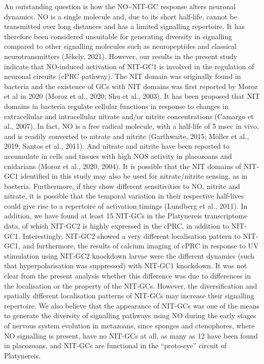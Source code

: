\documentclass[
  10pt,
  onecolumn]{article}
\begin{document}
An outstanding question is how the NO\textasciitilde NIT-GC response
alters neuronal dynamics. NO is a single molecule and, due to its short
half-life, cannot be transmitted over long distances and has a limited
signalling repertoire. It has therefore been considered unsuitable for
generating diversity in signalling compared to other signalling
molecules such as neuropeptides and classical neurotransmitters (Jékely,
2021). However, our results in the present study indicate that
NO-induced activation of NIT-GC1 is involved in the regulation of
neuronal circuits (cPRC pathway). The NIT domain was originally found in
bacteria and the existence of GCs with NIT domains was first reported by
Moroz et al in 2020 (Moroz et al., 2020; Shu et al., 2003). It has been
proposed that NIT domains in bacteria regulate cellular functions in
response to changes in extracellular and intracellular nitrate and/or
nitrite concentrations (Camargo et al., 2007). In fact, NO is a free
radical molecule, with a half-life of 5 msec in vivo, and is readily
converted to nitrate and nitrite (Garthwaite, 2015; Möller et al., 2019;
Santos et al., 2011). And nitrate and nitrite have been reported to
accumulate in cells and tissues with high NOS activity in placozoans and
cnidarians (Moroz et al., 2020, 2004). It is possible that the NIT
domains of NIT-GC1 identified in this study may also be used for
nitrate/nitrite sensing, as in bacteria. Furthermore, if they show
different sensitivities to NO, nitrite and nitrate, it is possible that
the temporal variation in their respective half-lives could give rise to
a repertoire of activation timings (Lundberg et al., 2011). In addition,
we have found at least 15 NIT-GCs in the Platynereis transcriptome data,
of which NIT-GC2 is highly expressed in the cPRC, in addition to
NIT-GC1. Interestingly, NIT-GC2 showed a very different localisation
pattern to NIT-GC1, and furthermore, the results of calcium imaging of
cPRC in response to UV stimulation using NIT-GC2 knockdown larvae were
the different dynamics (such that hyperpolarisation was suppressed) with
NIT-GC1 knockdown. It was not clear from the present analysis whether
this difference was due to differences in the localisation or the
property of the NIT-GCs. However, the diversification and spatially
different localisation patterns of NIT-GCs may increase their signalling
repertoire. We also believe that the appearance of NIT-GCs was one of
the means to generate the diversity of signalling pathways using NO
during the early stages of nervous system evolution in metazoans, since
sponges and ctenophores, where NO signalling is present, have no NIT-GCs
at all, as many as 12 have been found in placozoans, and NIT-GCs are
functional in the ``proto-eye'' circuit of Platynereis.
\end{document}
